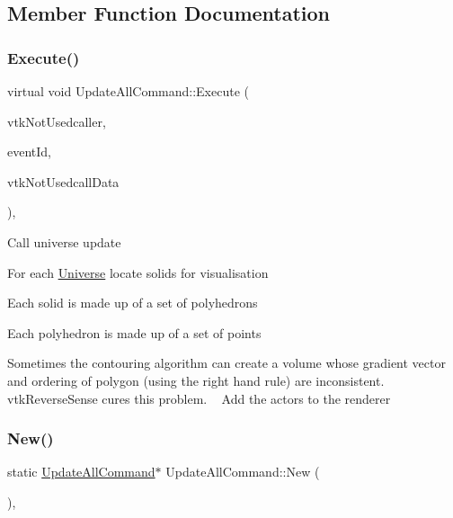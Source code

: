 \subsection{Member Function Documentation}
\mbox{\label{classUpdateAllCommand_a0a2dab315be55642c65d7fa1b2892ec8}} 
\subsubsection{\texorpdfstring{Execute()}{Execute()}}
{\footnotesize\ttfamily virtual void Update\+All\+Command\+::\+Execute (\begin{DoxyParamCaption}\item[{vtk\+Object $\ast$}]{vtk\+Not\+Usedcaller,  }\item[{unsigned long}]{event\+Id,  }\item[{void $\ast$}]{vtk\+Not\+Usedcall\+Data }\end{DoxyParamCaption})\hspace{0.3cm}{\ttfamily [inline]}, {\ttfamily [virtual]}}

Call universe update

For each \mbox{\hyperlink{classUniverse}{Universe}} locate solids for visualisation

Each solid is made up of a set of polyhedrons

Each polyhedron is made up of a set of points

Sometimes the contouring algorithm can create a volume whose gradient vector and ordering of polygon (using the right hand rule) are inconsistent. vtk\+Reverse\+Sense cures this problem. ~\newline
 Add the actors to the renderer \mbox{\label{classUpdateAllCommand_a97cd6ef1c68bb473aef27c898b175517}} 
\subsubsection{\texorpdfstring{New()}{New()}}
{\footnotesize\ttfamily static \mbox{\hyperlink{classUpdateAllCommand}{Update\+All\+Command}}$\ast$ Update\+All\+Command\+::\+New (\begin{DoxyParamCaption}{ }\end{DoxyParamCaption})\hspace{0.3cm}{\ttfamily [inline]}, {\ttfamily [static]}}

